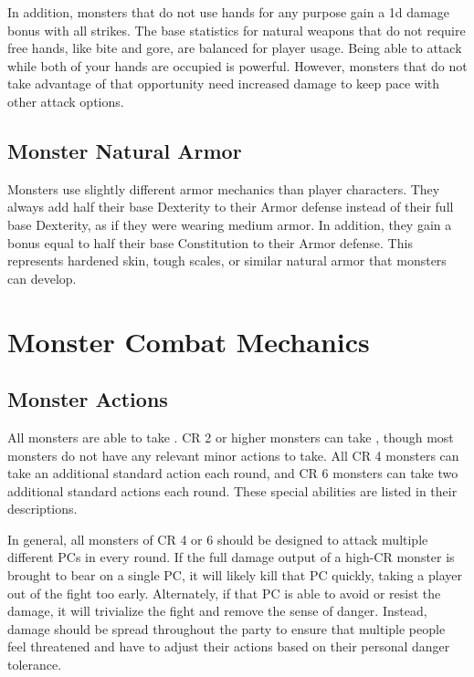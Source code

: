         In addition, monsters that do not use hands for any purpose gain a \plus1d damage bonus with all strikes.
        The base statistics for natural weapons that do not require free hands, like bite and gore, are balanced for player usage.
        Being able to attack while both of your hands are occupied is powerful.
        However, monsters that do not take advantage of that opportunity need increased damage to keep pace with other attack options.

    \subsection{Monster Natural Armor}\label{Monster Natural Armor}
        Monsters use slightly different armor mechanics than player characters.
        They always add half their base Dexterity to their Armor defense instead of their full base Dexterity, as if they were wearing medium armor.
        In addition, they gain a bonus equal to half their base Constitution to their Armor defense.
        This represents hardened skin, tough scales, or similar natural armor that monsters can develop.

\section{Monster Combat Mechanics}

    \subsection{Monster Actions}
        All monsters are able to take .
        CR 2 or higher monsters can take , though most monsters do not have any relevant minor actions to take.
        All CR 4 monsters can take an additional standard action each round, and CR 6 monsters can take two additional standard actions each round.
        These special abilities are listed in their descriptions.

        In general, all monsters of CR 4 or 6 should be designed to attack multiple different PCs in every round.
        If the full damage output of a high-CR monster is brought to bear on a single PC, it will likely kill that PC quickly, taking a player out of the fight too early.
        Alternately, if that PC is able to avoid or resist the damage, it will trivialize the fight and remove the sense of danger.
        Instead, damage should be spread throughout the party to ensure that multiple people feel threatened and have to adjust their actions based on their personal danger tolerance.

